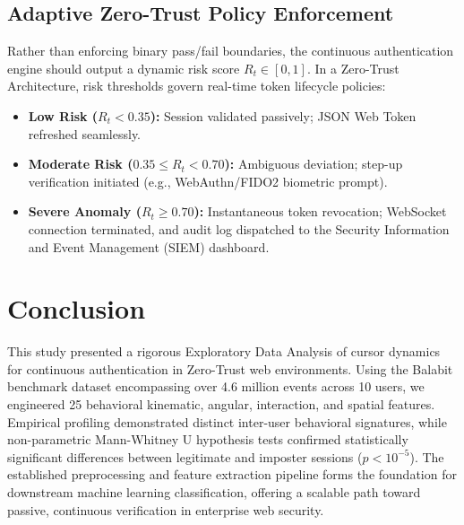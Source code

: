 \documentclass[10pt,journal,compsoc]{IEEEtran}
\begin{document}
\subsection{Adaptive Zero-Trust Policy Enforcement}
Rather than enforcing binary pass/fail boundaries, the continuous authentication engine should output a dynamic risk score $R_t \in [0, 1]$. In a Zero-Trust Architecture, risk thresholds govern real-time token lifecycle policies:
\begin{itemize}
    \item \textbf{Low Risk ($R_t < 0.35$):} Session validated passively; JSON Web Token refreshed seamlessly.
    \item \textbf{Moderate Risk ($0.35 \le R_t < 0.70$):} Ambiguous deviation; step-up verification initiated (e.g., WebAuthn/FIDO2 biometric prompt).
    \item \textbf{Severe Anomaly ($R_t \ge 0.70$):} Instantaneous token revocation; WebSocket connection terminated, and audit log dispatched to the Security Information and Event Management (SIEM) dashboard.
\end{itemize}

\section{Conclusion}
This study presented a rigorous Exploratory Data Analysis of cursor dynamics for continuous authentication in Zero-Trust web environments. Using the Balabit benchmark dataset encompassing over 4.6 million events across 10 users, we engineered 25 behavioral kinematic, angular, interaction, and spatial features. Empirical profiling demonstrated distinct inter-user behavioral signatures, while non-parametric Mann-Whitney U hypothesis tests confirmed statistically significant differences between legitimate and imposter sessions ($p < 10^{-5}$). The established preprocessing and feature extraction pipeline forms the foundation for downstream machine learning classification, offering a scalable path toward passive, continuous verification in enterprise web security.



\end{document}
